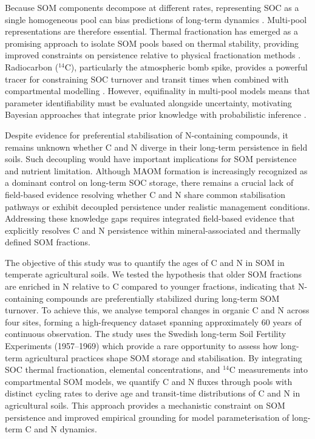 \documentclass[bg, manuscript]{copernicus}
\begin{document}
Because SOM components decompose at different rates, representing SOC as a single homogeneous pool can bias predictions of long-term dynamics \citep{KgelKnabner2008, Trumbore2009}. Multi-pool representations are therefore essential. Thermal fractionation has emerged as a promising approach to isolate SOM pools based on thermal stability, providing improved constraints on persistence relative to physical fractionation methods \citep{Sanderman2020, Stoner2023}. Radiocarbon ($^{14}\text{C}$), particularly the atmospheric bomb spike, provides a powerful tracer for constraining SOC turnover and transit times when combined with compartmental modelling \citep{Trumbore2009, Torn2009, Sierra2018a, Sierra2018b}. However, equifinality in multi-pool models means that parameter identifiability must be evaluated alongside uncertainty, motivating Bayesian approaches that integrate prior knowledge with probabilistic inference \citep{Wang2013}.

Despite evidence for preferential stabilisation of N-containing compounds, it remains unknown whether C and N diverge in their long-term persistence in field soils. Such decoupling would have important implications for SOM persistence and nutrient limitation. Although MAOM formation is increasingly recognized as a dominant control on long-term SOC storage, there remains a crucial lack of field-based evidence resolving whether C and N share common stabilisation pathways or exhibit decoupled persistence under realistic management conditions. Addressing these knowledge gaps requires integrated field-based evidence that explicitly resolves C and N persistence within mineral-associated and thermally defined SOM fractions.

The objective of this study was to quantify the ages of C and N in SOM in temperate agricultural soils. We tested the hypothesis that older SOM fractions are enriched in N relative to C compared to younger fractions, indicating that N-containing compounds are preferentially stabilized during long-term SOM turnover. To achieve this, we analyse temporal changes in organic C and N across four sites, forming a high-frequency dataset spanning approximately 60 years of continuous observation. The study uses the Swedish long-term Soil Fertility Experiments (1957--1969) \citep{Carlgren2001} which provide a rare opportunity to assess how long-term agricultural practices shape SOM storage and stabilisation. By integrating SOC thermal fractionation, elemental concentrations, and $^{14}\text{C}$ measurements into compartmental SOM models, we quantify C and N fluxes through pools with distinct cycling rates to derive age and transit-time distributions of C and N in agricultural soils. This approach provides a mechanistic constraint on SOM persistence and improved empirical grounding for model parameterisation of long-term C and N dynamics.
\end{document}
